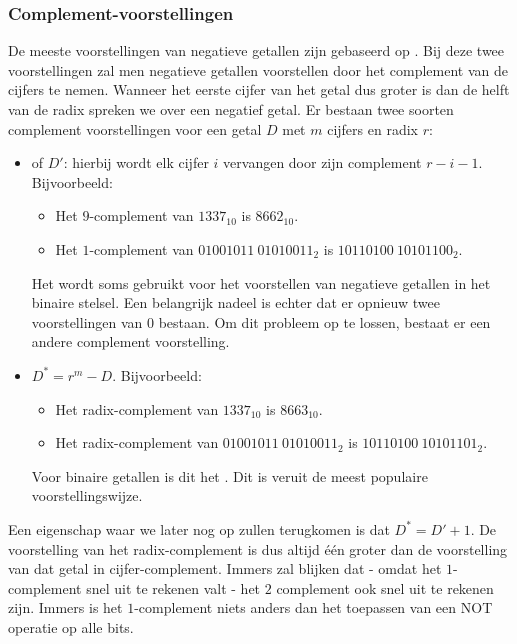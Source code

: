 \subsubsection{Complement-voorstellingen}
De meeste voorstellingen van negatieve getallen zijn gebaseerd op . Bij deze twee voorstellingen zal men negatieve getallen voorstellen door het complement van de cijfers te nemen. Wanneer het eerste cijfer van het getal dus groter is dan de helft van de radix spreken we over een negatief getal. Er bestaan twee soorten complement voorstellingen voor een getal $D$ met $m$ cijfers en radix $r$:
\begin{itemize}
 \item {} of  $D'$: hierbij wordt elk cijfer $i$ vervangen door zijn complement $r-i-1$. Bijvoorbeeld:
 \begin{itemize}
    \item Het $9$-complement van $1337_{10}$ is $8662_{10}$.
    \item Het $1$-complement van $01001011\ 01010011_2$ is $10110100\ 10101100_2$.
 \end{itemize}
 Het  wordt soms gebruikt voor het voorstellen van negatieve getallen in het binaire stelsel. Een belangrijk nadeel is echter dat er opnieuw twee voorstellingen van $0$ bestaan. Om dit probleem op te lossen, bestaat er een andere complement voorstelling.
 \item {} $D^*=r^m-D$. Bijvoorbeeld:
 \begin{itemize}
    \item Het radix-complement van $1337_{10}$ is $8663_{10}$.
    \item Het radix-complement van $01001011\ 01010011_2$ is $10110100\ 10101101_2$.
 \end{itemize}
 Voor binaire getallen is dit het . Dit is veruit de meest populaire voorstellingswijze.
\end{itemize}
Een eigenschap waar we later nog op zullen terugkomen is dat $D^*=D'+1$. De voorstelling van het radix-complement is dus altijd \'e\'en groter dan de voorstelling van dat getal in cijfer-complement. Immers zal blijken dat - omdat het $1$-complement snel uit te rekenen valt - het $2$ complement ook snel uit te rekenen zijn. Immers is het $1$-complement niets anders dan het toepassen van een NOT operatie op alle bits.

